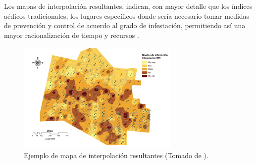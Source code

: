 Los mapas de interpolación resultantes, indican, con mayor detalle que los índices aédicos
tradicionales, los lugares específicos donde sería necesario tomar medidas de prevención y
control de acuerdo al grado de infestación, permitiendo así una mayor racionalización de tiempo y
recursos \cite{NINO2011}.

\begin{figure}[!htbp]
\centering
\includegraphics[width=0.7\textwidth]{capitulo-2/graphics/puntos-control-interpolacion.png}
\caption{\label{fig:sig-puntos-control-interpolacion}Ejemplo de mapa de interpolación resultantes (Tomado de \cite{NINO2011}).}
\end{figure}

